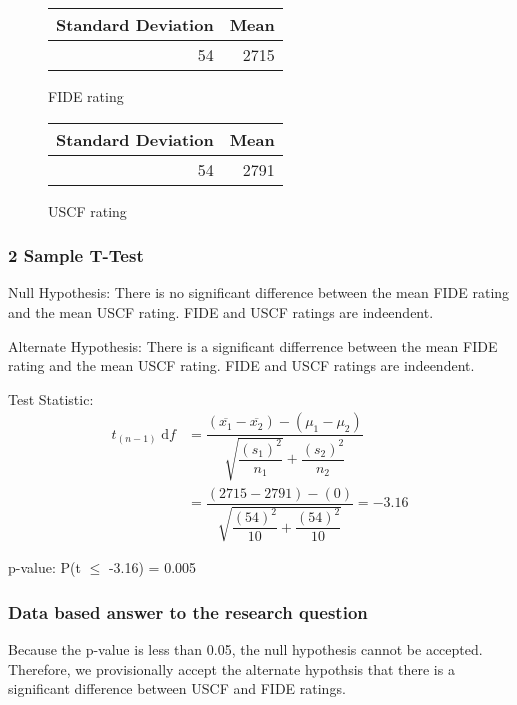 \documentclass[12pt, titlepage]{article}
\begin{document}
\begin{figure}[H]
\centering
\begin{tabular}{rr}
Standard Deviation & Mean\\
\hline
54 & 2715\\
\end{tabular}
    \caption{FIDE rating}
\end{figure}

\begin{figure}[H]
  \centering
\begin{tabular}{rr}
Standard Deviation & Mean\\
\hline
54 & 2791\\
\end{tabular}
    \caption{USCF rating}
\end{figure}

\subsubsection{2 Sample T-Test}
Null Hypothesis: There is no significant difference between the mean FIDE rating and the mean USCF rating. FIDE and USCF ratings are indeendent.

Alternate Hypothesis: There is a significant differrence between the mean FIDE rating and the mean USCF rating. FIDE and USCF ratings are indeendent.

Test Statistic: 
\begin{equation*}
\begin{split}
    t_{(n-1)} \; \textrm{d}f & = \dfrac{(\overline{x_{1}} - \overline{x_{2}}) - (\mu_{1} - \mu_{2})}{\sqrt{\dfrac{(s_{1})^{2}}{n_{1}}} + \dfrac{(s_{2})^{2}}{n_{2}}} \\
    & = \dfrac{(2715-2791) - (0)}{\sqrt{\dfrac{(54)^{2}}{10} + \dfrac{(54)^{2}}{10}}} = -3.16
\end{split}
\end{equation*}

p-value: P(t \(\leq\) -3.16) = 0.005

\subsubsection{Data based answer to the research question}
Because the p-value is less than 0.05, the null hypothesis cannot be accepted. Therefore, we provisionally accept the alternate hypothsis that there is a significant difference between USCF and FIDE ratings.
\end{document}
